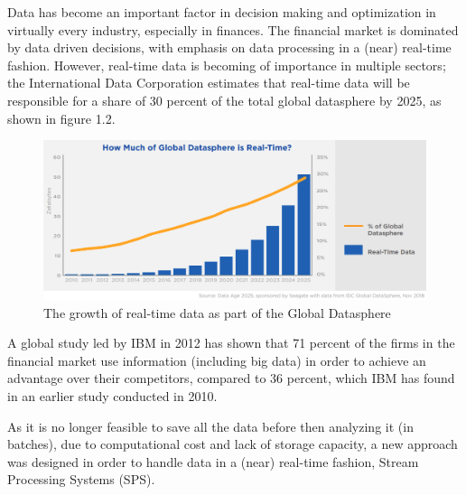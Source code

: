 Data has become an important factor in decision making and optimization in virtually every industry, especially in finances. 
The financial market is dominated by data driven decisions, with emphasis on data processing in a (near) real-time fashion.
However, real-time data is becoming of importance in multiple sectors; the International Data Corporation estimates that real-time data will be 
responsible for a share of 30 percent of the total global datasphere by 2025, as shown in figure 1.2.
\begin{figure}[h]
\centering
\includegraphics[width=1.0\textwidth]{Bilder/realtime_data.png}
\caption{The growth of real-time data as part of the Global Datasphere \cite[p.13]{idc-seagate-data}}
\label{fig:growth_realtime_data}
\end{figure}

A global study led by IBM in 2012 has shown that 71 percent of the firms in the financial market use information (including big data)
in order to achieve an advantage over their competitors, compared to 36 percent, which IBM has found in an earlier study conducted in 2010. \cite[p.1]{ibm-financial}

As it is no longer feasible to save all the data before then analyzing it (in batches), due to computational cost and lack of storage capacity, 
a new approach was designed in order to handle data in a (near) real-time fashion, Stream Processing Systems (SPS).
